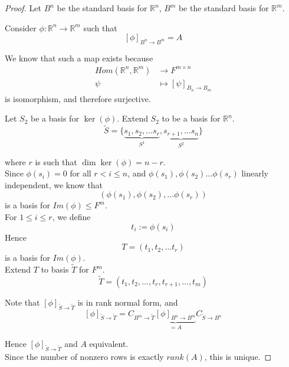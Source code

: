 \begin{proof}       
    Let $B^n$ be the standard basis for $\mathbb{R}^n$, $B^m$ be the standard basis for $\mathbb{R}^m$. 

    Consider $\phi: \mathbb{R}^n \to \mathbb{R}^m$ such that 
    \[
        \left[ \phi \right]_{B^n \to B^m} = A
    \]

    We know that such a map exists because 
    \begin{align*}
        Hom \left( \mathbb{R}^n , \mathbb{R}^m \right)  &\to F^{m \times n} \\
        \psi &\mapsto \left[ \psi \right]_{B_n \to B_m}
    \end{align*}
    is isomorphism, and therefore surjective. 

    Let $S_2$ be a basis for $\ker( \phi)$. Extend $S_2$ to be a basis for $\mathbb{R}^n$. \\

    \[
        \tilde{S} = \{\underbrace{s_1, s_2, \hdots s_r}_{S^1}, \underbrace{s_{r + 1}, \hdots s_n}_{S^2} \} 
    \]

    where $r$ is such that $\dim \ker( \phi) = n - r$. \\

    Since $\phi(s_i) = 0$ for all $r < i \leq n$, and $\phi(s_1), \phi(s_2) \hdots \phi(s_r)$ linearly independent, we know that 
    \[
        \left( \phi(s_1), \phi(s_2), \hdots \phi(s_r) \right) 
    \]
    is a basis for $Im( \phi) \leq F^m$. \\

    For $1 \leq i \leq r$, we define 
    \[
        t_i := \phi(s_i)
    \]
    Hence 
    \[
        T = (t_1, t_2, \hdots t_r) 
    \]
    is a basis for $Im( \phi)$. \\

    Extend $T$ to basis $\tilde{T}$ for $F^m$.
    \[
        \tilde{T} = (t_1, t_2, \hdots, t_r, t_{r + 1}, \hdots, t_m)
    \]

    Note that $[ \phi]_{\tilde{S} \to \tilde{T}}$ is in rank normal form, and 
    \[
        \left[ \phi \right]_{\tilde{S} \to \tilde{T}} = C_{B^m \to \tilde{T}} \underbrace{\left[ \phi \right]_{B^n \to B^m}}_{=A} C_{\tilde{S} \to B^n}
    \]

    Hence $[\phi]_{\tilde{S} \to \tilde{T}}$ and $A$ equivalent. \\

    Since the number of nonzero rows is exactly $rank(A)$, this is unique. 
    
\end{proof}     

